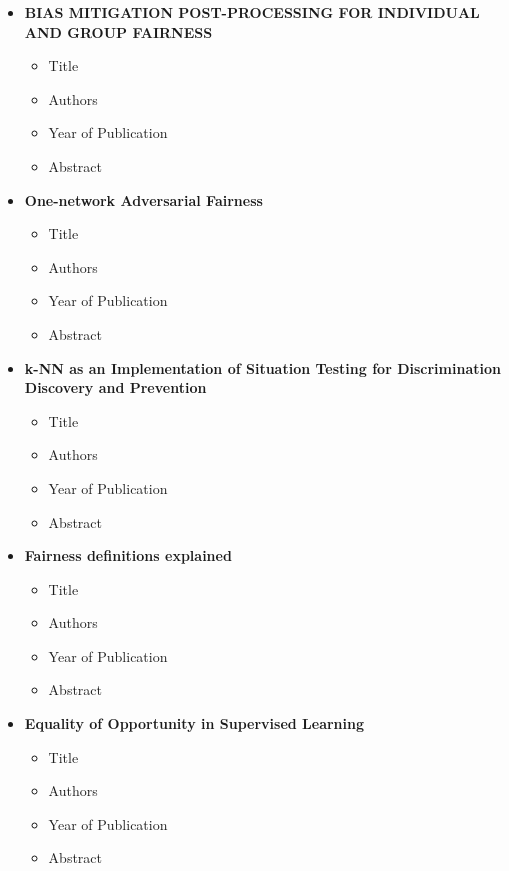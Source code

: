 \documentclass{article}
\begin{document}
\begin{itemize}
        \item \textbf{BIAS MITIGATION POST-PROCESSING FOR INDIVIDUAL AND GROUP FAIRNESS}
        \begin{itemize}
            \item Title
            \item Authors
            \item Year of Publication
            \item Abstract
        \end{itemize}
        
        \item \textbf{One-network Adversarial Fairness}
        \begin{itemize}
            \item Title
            \item Authors
            \item Year of Publication
            \item Abstract
        \end{itemize}
        
        \item \textbf{k-NN as an Implementation of Situation Testing for Discrimination Discovery and Prevention}
        \begin{itemize}
            \item Title
            \item Authors
            \item Year of Publication
            \item Abstract
        \end{itemize}
        
        \item \textbf{Fairness definitions explained}
        \begin{itemize}
            \item Title
            \item Authors
            \item Year of Publication
            \item Abstract
        \end{itemize}
        
        \item \textbf{Equality of Opportunity in Supervised Learning}
        \begin{itemize}
            \item Title
            \item Authors
            \item Year of Publication
            \item Abstract
        \end{itemize}
        

\end{itemize}
\end{document}
